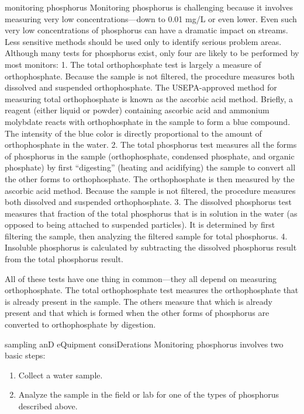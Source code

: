 \documentclass{article}
\begin{document}
monitoring phosphorus Monitoring phosphorus is challenging because it
involves measuring very low concentrations---down to 0.01 mg/L or even
lower. Even such very low concentrations of phosphorus can have a
dramatic impact on streams. Less sensitive methods should be used only
to identify serious problem areas. Although many tests for phosphorus
exist, only four are likely to be performed by most monitors: 1. The
total orthophosphate test is largely a measure of orthophosphate.
Because the sample is not filtered, the procedure measures both
dissolved and suspended orthophosphate. The USEPA-approved method for
measuring total orthophosphate is known as the ascorbic acid method.
Briefly, a reagent (either liquid or powder) containing ascorbic acid
and ammonium molybdate reacts with orthophosphate in the sample to form
a blue compound. The intensity of the blue color is directly
proportional to the amount of orthophosphate in the water. 2. The total
phosphorus test measures all the forms of phosphorus in the sample
(orthophosphate, condensed phosphate, and organic phosphate) by first
``digesting'' (heating and acidifying) the sample to convert all the
other forms to orthophosphate. The orthophosphate is then measured by
the ascorbic acid method. Because the sample is not filtered, the
procedure measures both dissolved and suspended orthophosphate. 3. The
dissolved phosphorus test measures that fraction of the total phosphorus
that is in solution in the water (as opposed to being attached to
suspended particles). It is determined by first filtering the sample,
then analyzing the filtered sample for total phosphorus. 4. Insoluble
phosphorus is calculated by subtracting the dissolved phosphorus result
from the total phosphorus result.

All of these tests have one thing in common---they all depend on
measuring orthophosphate. The total orthophosphate test measures the
orthophosphate that is already present in the sample. The others measure
that which is already present and that which is formed when the other
forms of phosphorus are converted to orthophosphate by digestion.

sampling anD eQuipment consiDerations Monitoring phosphorus involves two
basic steps:

\begin{enumerate}
\item
  Collect a water sample.
\item
  Analyze the sample in the field or lab for one of the types of
  phosphorus described above.
\end{enumerate}
\end{document}

